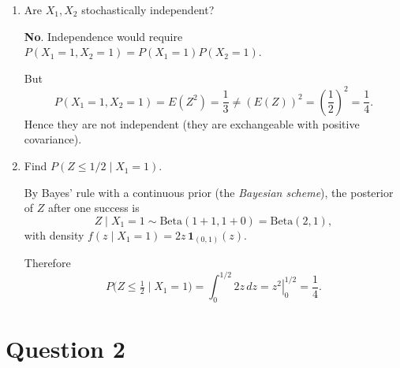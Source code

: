 \documentclass[dvipsnames,11pt]{article}
\begin{document}
\begin{enumerate}[label=\alph*.]
\begin{solution}
            \end{solution}
            
        \item Are $X_1,X_2$ stochastically independent?
    
            \begin{solution}
    
                \textbf{No}. Independence would require $P(X_1=1,X_2=1)=P(X_1=1)P(X_2=1)$. 
                
                But
                \[
                P(X_1=1,X_2=1)=E(Z^2)=\frac13\neq \left(E(Z)\right)^2=\left(\frac12\right)^2=\frac14.
                \]
                Hence they are not independent (they are exchangeable with positive covariance).
                
            \end{solution}
            
        \item Find $P(Z\leq 1/2\mid X_1=1)$.
    
            \begin{solution}
    
                By Bayes’ rule with a continuous prior (the \emph{Bayesian scheme}), the posterior of $Z$ after one success is
                \[
                Z\mid X_1=1\sim \mathrm{Beta}(1+1,1+0)=\mathrm{Beta}(2,1),
                \]
                with density $f(z\mid X_1=1)=2z\,\mathbf 1_{(0,1)}(z)$. 
                
                Therefore
                \[
                P\big(Z\le \tfrac12 \mid X_1=1\big)=\int_0^{1/2} 2z\,dz=\left.z^2\right|_{0}^{1/2}=\frac14.
                \]

            \end{solution}
            
    \end{enumerate}


\section*{Question 2}
\end{document}
